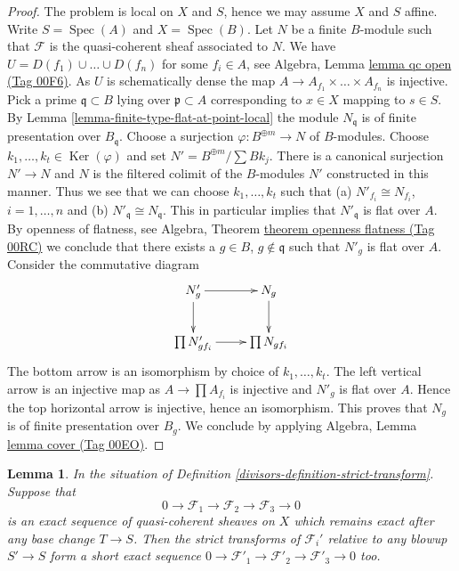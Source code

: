\documentclass{amsart}
\theoremstyle{plain}
\newtheorem{lemma}[subsection]{Lemma}
\theoremstyle{definition}
\theoremstyle{remark}
\numberwithin{equation}{subsection}
\def\Spec{\mathop{\mathrm{Spec}}}
\def\Ker{\mathop{\mathrm{Ker}}}
\begin{document}
\begin{proof}
The problem is local on $X$ and $S$, hence we may assume $X$ and $S$ affine.
Write $S = \Spec(A)$ and $X = \Spec(B)$. Let $N$ be a finite $B$-module such
that $\mathcal{F}$ is the quasi-coherent sheaf associated to $N$.
We have $U = D(f_1) \cup \ldots \cup D(f_n)$ for some $f_i \in A$, see
Algebra, Lemma \href{https://stacks.math.columbia.edu/tag/00F6}{lemma qc open (Tag 00F6)}.
As $U$ is schematically dense the map
$A \to A_{f_1} \times \ldots \times A_{f_n}$ is injective.
Pick a prime $\mathfrak q \subset B$ lying over $\mathfrak p \subset A$
corresponding to $x \in X$ mapping to $s \in S$.
By Lemma \ref{lemma-finite-type-flat-at-point-local}
the module $N_\mathfrak q$ is of finite presentation over $B_\mathfrak q$.
Choose a surjection $\varphi : B^{\oplus m} \to N$ of $B$-modules.
Choose $k_1, \ldots, k_t \in \Ker(\varphi)$ and
set $N' = B^{\oplus m}/\sum Bk_j$. There is a canonical surjection
$N' \to N$ and $N$ is the filtered colimit of the $B$-modules $N'$
constructed in this manner. Thus we see that we can choose
$k_1, \ldots, k_t$ such that (a) $N'_{f_i} \cong N_{f_i}$, $i = 1, \ldots, n$
and (b) $N'_\mathfrak q \cong N_\mathfrak q$.
This in particular implies that $N'_\mathfrak q$ is flat over $A$.
By openness of flatness, see
Algebra, Theorem \href{https://stacks.math.columbia.edu/tag/00RC}{theorem openness flatness (Tag 00RC)}
we conclude that there exists a $g \in B$, $g \not \in \mathfrak q$
such that $N'_g$ is flat over $A$. Consider the commutative diagram
$$
\xymatrix{
N'_g \ar[r] \ar[d] & N_g \ar[d] \\
\prod N'_{gf_i} \ar[r] & \prod N_{gf_i}
}
$$
The bottom arrow is an isomorphism by choice of $k_1, \ldots, k_t$.
The left vertical arrow is an injective map as
$A \to \prod A_{f_i}$ is injective and $N'_g$ is flat over $A$.
Hence the top horizontal arrow is injective, hence an isomorphism.
This proves that $N_g$ is of finite presentation over $B_g$.
We conclude by applying
Algebra, Lemma \href{https://stacks.math.columbia.edu/tag/00EO}{lemma cover (Tag 00EO)}.
\end{proof}


\begin{lemma}
\label{divisors-lemma-strict-transform-universally-injective}
In the situation of Definition \ref{divisors-definition-strict-transform}.
Suppose that
$$
0 \to \mathcal{F}_1 \to \mathcal{F}_2 \to \mathcal{F}_3 \to 0
$$
is an exact sequence of quasi-coherent sheaves on $X$ which remains
exact after any base change $T \to S$. Then the strict transforms of
$\mathcal{F}_i'$ relative to any blowup $S' \to S$
form a short exact sequence
$0 \to \mathcal{F}'_1 \to \mathcal{F}'_2 \to \mathcal{F}'_3 \to 0$ too.
\end{lemma}
\end{document}
